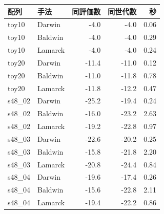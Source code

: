 \begin{tabular}{llrrr}
\hline
配列 & 手法 & 同評価数 & 同世代数 & 秒\\
\hline
toy10 & Darwin & -4.0 & -4.0 & 0.06\\
toy10 & Baldwin & -4.0 & -4.0 & 0.29\\
toy10 & Lamarck & -4.0 & -4.0 & 0.24\\
toy20 & Darwin & -11.4 & -11.0 & 0.12\\
toy20 & Baldwin & -11.0 & -11.8 & 0.78\\
toy20 & Lamarck & -11.8 & -12.2 & 0.47\\
s48\_02 & Darwin & -25.2 & -19.4 & 0.24\\
s48\_02 & Baldwin & -16.0 & -23.2 & 2.63\\
s48\_02 & Lamarck & -19.2 & -22.8 & 0.97\\
s48\_03 & Darwin & -22.6 & -20.2 & 0.25\\
s48\_03 & Baldwin & -15.8 & -21.8 & 2.20\\
s48\_03 & Lamarck & -20.8 & -24.4 & 0.84\\
s48\_04 & Darwin & -19.6 & -17.4 & 0.26\\
s48\_04 & Baldwin & -15.6 & -22.8 & 2.11\\
s48\_04 & Lamarck & -19.4 & -22.2 & 0.86\\
\hline
\end{tabular}
